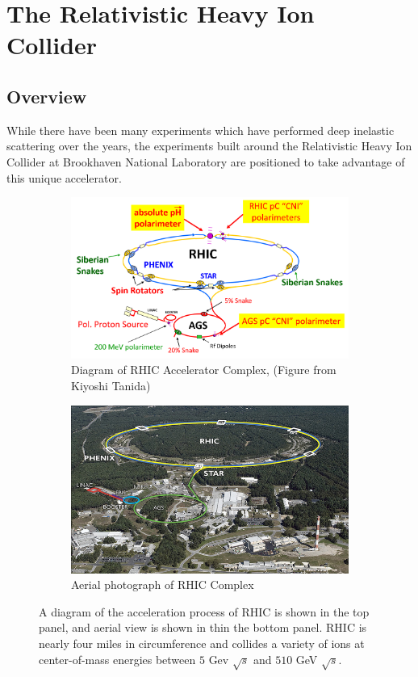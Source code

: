 \chapter{The Relativistic Heavy Ion Collider}
\label{ch:experimental_apparatus}

\section{Overview}
While there have been many experiments which have performed deep inelastic
scattering over the years, the experiments built around the Relativistic Heavy
Ion Collider at Brookhaven National Laboratory are positioned to take advantage
of this unique accelerator. 

\begin{figure}[ht]
  \centering
  \begin{subfigure}[b]{\textwidth}
    \centering
    \includegraphics[width=0.8\linewidth]{./figures/kiyoshi_tanida_rhic_schematic.png}
    \caption{Diagram of RHIC Accelerator Complex, (Figure from Kiyoshi Tanida)}
    \label{fig:rhic_schematic} 
  \end{subfigure}
  \begin{subfigure}[b]{\textwidth}
    \centering
    \includegraphics[width=0.8\linewidth]{./figures/7979381212_fddf3f1ab4_z.jpg}
    \caption{Aerial photograph of RHIC Complex \cite{BNLFlickr2011}}
    \label{fig:rhic_aerial}
  \end{subfigure}
  \caption{
		A diagram of the acceleration process of RHIC is shown in the top panel, and
		aerial view is shown in thin the bottom panel. RHIC is nearly four miles in
		circumference and collides a variety of ions at center-of-mass energies
		between $5$ Gev $\sqrt{s}$  and $510$ GeV $\sqrt{s}$.
  }
  \label{fig:rhic_complex}
\end{figure}

